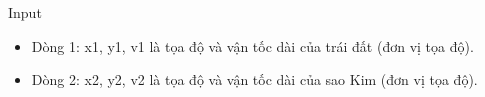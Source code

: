 Input  
\begin{itemize}
	\item     Dòng 1: x1, y1, v1 là tọa độ và vận tốc dài của trái đất (đơn vị tọa độ).   
	\item      Dòng 2: x2, y2, v2 là tọa độ và vận tốc dài của sao Kim (đơn vị tọa độ).    
\end{itemize}